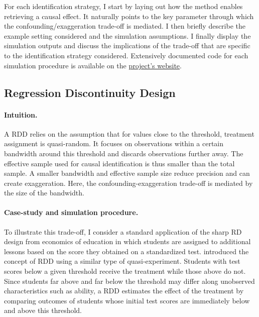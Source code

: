 \documentclass[usletter, 12pt]{article}
\begin{document}
     		For each identification strategy, I start by laying out how the method enables retrieving a causal effect. It naturally points to the key parameter through which the confounding/exaggeration trade-off is mediated. I then briefly describe the example setting considered and the simulation assumptions. I finally display the simulation outputs and discuss the implications of the trade-off that are specific to the identification strategy considered. Extensively documented code for each simulation procedure is available on the \href{https://vincentbagilet.github.io/causal_exaggeration/}{project's website}.
		
		
		 \subsection{Regression Discontinuity Design}
		
     			\paragraph{Intuition.} A RDD relies on the assumption that for values close to the threshold, treatment assignment is quasi-random. It focuses on observations within a certain bandwidth around this threshold and discards observations further away. The effective sample used for causal identification is thus smaller than the total sample. A smaller bandwidth and effective sample size reduce precision and can create exaggeration. Here, the confounding-exaggeration trade-off is mediated by the size of the bandwidth. 

			\paragraph{Case-study and simulation procedure.} To illustrate this trade-off, I consider a standard application of the sharp RD design from economics of education in which students are assigned to additional lessons based on the score they obtained on a standardized test. \cite{thistlethwaite_regression-discontinuity_1960} introduced the concept of RDD using a similar type of quasi-experiment. Students with test scores below a given threshold receive the treatment while those above do not. Since students far above and far below the threshold may differ along unobserved characteristics such as ability, a RDD estimates the effect of the treatment by comparing outcomes of students whose initial test scores are immediately below and above this threshold. 
        
\end{document}
